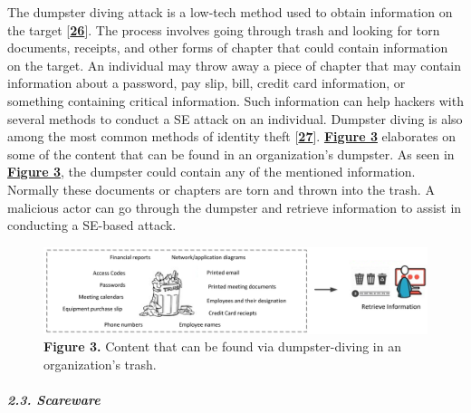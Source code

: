 The dumpster diving attack is a low-tech method used to obtain information on the target [\href{https://www.mdpi.com/2076-3417/12/12/6042\#B26-applsci-12-06042}{\textbf{26}}]. The process involves going through trash and looking for torn documents, receipts, and other forms of chapter that could contain information on the target. An individual may throw away a piece of chapter that may contain information about a password, pay slip, bill, credit card information, or something containing critical information. Such information can help hackers with several methods to conduct a SE attack on an individual. Dumpster diving is also among the most common methods of identity theft [\href{https://www.mdpi.com/2076-3417/12/12/6042\#B27-applsci-12-06042}{\textbf{27}}]. \href{https://www.mdpi.com/2076-3417/12/12/6042\#fig_body_display_applsci-12-06042-f003}{\textbf{Figure 3}} elaborates on some of the content that can be found in an organization’s dumpster. As seen in \href{https://www.mdpi.com/2076-3417/12/12/6042\#fig_body_display_applsci-12-06042-f003}{\textbf{Figure 3}}, the dumpster could contain any of the mentioned information. Normally these documents or chapters are torn and thrown into the trash. A malicious actor can go through the dumpster and retrieve information to assist in conducting a SE-based attack. 
\begin{figure}
    \justifying
    \includegraphics[width=0.75\linewidth]{dumpsterdive.png}
    \caption{\textbf{Figure 3.} Content that can be found via dumpster-diving in an organization’s trash.}
    \label{fig:placeholder}
\end{figure}

\paragraph{\textit{2.3. Scareware}}


